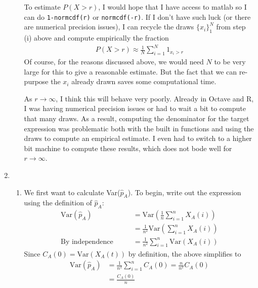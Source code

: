 \documentclass[12pt]{article}
\theoremstyle{plain}
\theoremstyle{definition}
\theoremstyle{remark}
\begin{document}
\begin{enumerate}
\begin{enumerate}
        To estimate $P(X>r)$, I would hope that I have access to matlab
        so I can do \texttt{1-normcdf(r)} or \texttt{normcdf(-r)}. If I
        don't have such luck (or there are numerical precision issues),
        I can recycle the draws $\{x_i\}^N_1$ from step (i) above and
        compute empirically the fraction
        \begin{align*}
          P(X>r) \approx \frac{1}{N} \sum^N_{i=1} 1_{x_i > r}
        \end{align*} Of course, for the reasons discussed above, we
        would need $N$ to be very large for this to give a reasonable
        estimate. But the fact that we can re-purpose the $x_i$ already
        drawn saves some computational time.

        As $r\rightarrow\infty$, I think this will behave very poorly.
        Already in Octave and R, I was having numerical precision
        issues or had to wait a bit to compute that many draws. As a
        result, computing the denominator for the target expression was
        problematic both with the built in functions and using the draws
        to compute an empirical estimate. I even had to switch to a
        higher bit machine to compute these results, which does not bode
        well for $r\rightarrow\infty$.


    \end{enumerate}

  \item %
    \begin{enumerate}
      \item %
        We first want to calculate Var($\hat{p}_A$). To begin, write out
        the expression using the definition of $\hat{p}_A$:
        \begin{align*}
          \text{Var}(\hat{p}_A)
          &=\text{Var}\left( \frac{1}{n} \sum^n_{i=1} X_A(i)\right) \\
          &= \frac{1}{n^2} \text{Var}\left( \sum^n_{i=1} X_A(i)\right) \\
          \text{By independence} \qquad
          &= \frac{1}{n^2} \sum^n_{i=1}  \text{Var}\left(X_A(i)\right)
        \end{align*}
        Since $C_A(0) = \text{Var}(X_A(t))$ by definition, the above
        simplifies to
        \begin{align*}
          \text{Var}(\hat{p}_A)
          &= \frac{1}{n^2} \sum^n_{i=1}  C_A(0)
          = \frac{n}{n^2} C_A(0)\\
          &= \frac{C_A(0)}{n}
        \end{align*}


\end{enumerate}
\end{enumerate}
\end{document}
